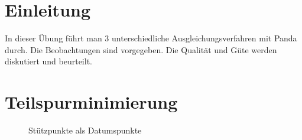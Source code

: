 \documentclass[12pt]{article}
\begin{document}
	\pagestyle{main}
\tableofcontents
\newpage
\section{Einleitung}
In dieser Übung führt man 3 unterschiedliche Ausgleichungsverfahren mit Panda durch. Die Beobachtungen sind vorgegeben. Die Qualität und Güte werden diskutiert und beurteilt. 

\section{Teilspurminimierung}
\begin{figure}[ht]\centering
	\caption{Stützpunkte als Datumspunkte}
\end{figure}
\newpage
\end{document}
